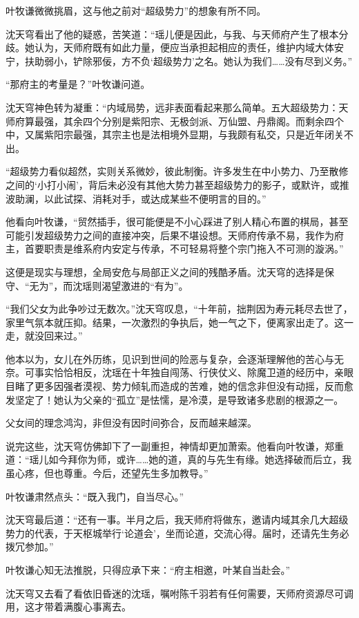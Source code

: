 叶牧谦微微挑眉，这与他之前对“超级势力”的想象有所不同。

沈天穹看出了他的疑惑，苦笑道：“瑶儿便是因此，与我、与天师府产生了根本分歧。她认为，天师府既有如此力量，便应当承担起相应的责任，维护内域大体安宁，扶助弱小，铲除邪佞，方不负‘超级势力’之名。她认为我们……没有尽到义务。”

“那府主的考量是？”叶牧谦问道。

沈天穹神色转为凝重：“内域局势，远非表面看起来那么简单。五大超级势力：天师府算最强，其余四个分别是紫阳宗、无极剑派、万仙盟、丹鼎阁。而剩余四个中，又属紫阳宗最强，其宗主也是法相境外显期，与我颇有私交，只是近年闭关不出。

“超级势力看似超然，实则关系微妙，彼此制衡。许多发生在中小势力、乃至散修之间的‘小打小闹’，背后未必没有其他大势力甚至超级势力的影子，或默许，或推波助澜，以此试探、消耗对手，或达成某些不便明言的目的。”

他看向叶牧谦，“贸然插手，很可能便是不小心踩进了别人精心布置的棋局，甚至可能引发超级势力之间的直接冲突，后果不堪设想。天师府传承不易，我作为府主，首要职责是维系府内安定与传承，不可轻易将整个宗门拖入不可测的漩涡。”

这便是现实与理想，全局安危与局部正义之间的残酷矛盾。沈天穹的选择是保守、“无为”，而沈瑶则渴望激进的“有为”。

“我们父女为此争吵过无数次。”沈天穹叹息，“十年前，拙荆因为寿元耗尽去世了，家里气氛本就压抑。结果，一次激烈的争执后，她一气之下，便离家出走了。这一走，就没回来过。”

他本以为，女儿在外历练，见识到世间的险恶与复杂，会逐渐理解他的苦心与无奈。可事实恰恰相反，沈瑶在十年独自闯荡、行侠仗义、除魔卫道的经历中，亲眼目睹了更多因强者漠视、势力倾轧而造成的苦难，她的信念非但没有动摇，反而愈发坚定了！她认为父亲的“孤立”是怯懦，是冷漠，是导致诸多悲剧的根源之一。

父女间的理念鸿沟，非但没有因时间弥合，反而越来越深。

说完这些，沈天穹仿佛卸下了一副重担，神情却更加萧索。他看向叶牧谦，郑重道：“瑶儿如今拜你为师，或许……她的道，真的与先生有缘。她选择破而后立，我虽心疼，但也尊重。今后，还望先生多加教导。”

叶牧谦肃然点头：“既入我门，自当尽心。”

沈天穹最后道：“还有一事。半月之后，我天师府将做东，邀请内域其余几大超级势力的代表，于天枢城举行‘论道会’，坐而论道，交流心得。届时，还请先生务必拨冗参加。”

叶牧谦心知无法推脱，只得应承下来：“府主相邀，叶某自当赴会。”

沈天穹又去看了看依旧昏迷的沈瑶，嘱咐陈千羽若有任何需要，天师府资源尽可调用，这才带着满腹心事离去。

